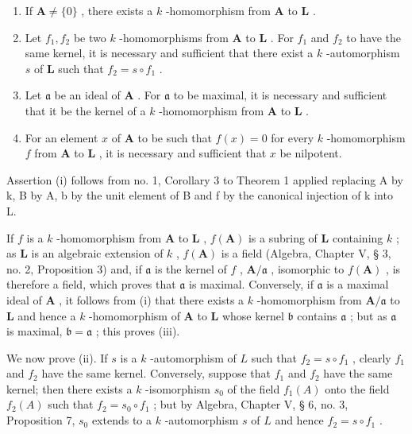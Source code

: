\begin{enumerate}
\def\labelenumi{(\roman{enumi})}
\item
  If \(\mathbf{A} \neq \{0\}\) , there exists a \(k\) -homomorphism from \(\mathbf{A}\) to \(\mathbf{L}\) .
\item
  Let \(f_{1}, f_{2}\) be two \(k\) -homomorphisms from \(\mathbf{A}\) to \(\mathbf{L}\) . For \(f_{1}\) and \(f_{2}\) to have the same kernel, it is necessary and sufficient that there exist a \(k\) -automorphism \(s\) of \(\mathbf{L}\) such that \(f_{2} = s \circ f_{1}\) .
\item
  Let \(\mathfrak{a}\) be an ideal of \(\mathbf{A}\) . For \(\mathfrak{a}\) to be maximal, it is necessary and sufficient that it be the kernel of a \(k\) -homomorphism from \(\mathbf{A}\) to \(\mathbf{L}\) .
\item
  For an element \(x\) of \(\mathbf{A}\) to be such that \(f(x) = 0\) for every \(k\) -homomorphism \(f\) from \(\mathbf{A}\) to \(\mathbf{L}\) , it is necessary and sufficient that \(x\) be nilpotent.
\end{enumerate}

Assertion (i) follows from no. 1, Corollary 3 to Theorem 1 applied replacing A by k, B by A, b by the unit element of B and f by the canonical injection of k into L.

If \(f\) is a \(k\) -homomorphism from \(\mathbf{A}\) to \(\mathbf{L}\) , \(f(\mathbf{A})\) is a subring of \(\mathbf{L}\) containing \(k\) ; as \(\mathbf{L}\) is an algebraic extension of \(k\) , \(f(\mathbf{A})\) is a field (Algebra, Chapter V, § 3, no. 2, Proposition 3) and, if \(\mathfrak{a}\) is the kernel of \(f\) , \(\mathbf{A} / \mathfrak{a}\) , isomorphic to \(f(\mathbf{A})\) , is therefore a field, which proves that \(\mathfrak{a}\) is maximal. Conversely, if \(\mathfrak{a}\) is a maximal ideal of \(\mathbf{A}\) , it follows from (i) that there exists a \(k\) -homomorphism from \(\mathbf{A} / \mathfrak{a}\) to \(\mathbf{L}\) and hence a \(k\) -homomorphism of \(\mathbf{A}\) to \(\mathbf{L}\) whose kernel \(\mathfrak{b}\) contains \(\mathfrak{a}\) ; but as \(\mathfrak{a}\) is maximal, \(\mathfrak{b} = \mathfrak{a}\) ; this proves (iii).

We now prove (ii). If \(s\) is a \(k\) -automorphism of \(L\) such that \(f_2 = s \circ f_1\) , clearly \(f_1\) and \(f_2\) have the same kernel. Conversely, suppose that \(f_1\) and \(f_2\) have the same kernel; then there exists a \(k\) -isomorphism \(s_0\) of the field \(f_1(A)\) onto the field \(f_2(A)\) such that \(f_2 = s_0 \circ f_1\) ; but by Algebra, Chapter V, § 6, no. 3, Proposition 7, \(s_0\) extends to a \(k\) -automorphism \(s\) of \(L\) and hence \(f_2 = s \circ f_1\) .

